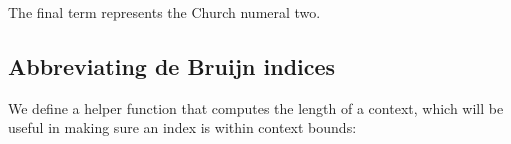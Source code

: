 \begin{fence}
\begin{code}
\AgdaSpace{}%
\AgdaSpace{}%
\AgdaSpace{}%
\AgdaSymbol{))}\<%
\\
%
\\[\AgdaEmptyExtraSkip]%
\>[0]\AgdaFunction{\AgdaUnderscore{}}\AgdaSpace{}%
\AgdaSymbol{:}\AgdaSpace{}%
\AgdaSpace{}%
\AgdaSpace{}%
\AgdaSymbol{(}\AgdaSpace{}%
\AgdaSpace{}%
\AgdaSymbol{)}\AgdaSpace{}%
\AgdaSpace{}%
\AgdaSpace{}%
\AgdaSpace{}%
\<%
\\
\>[0]\AgdaSymbol{\AgdaUnderscore{}}\AgdaSpace{}%
\AgdaSymbol{=}\AgdaSpace{}%
\AgdaSpace{}%
\AgdaSpace{}%
\AgdaSymbol{(}\AgdaSpace{}%
\AgdaSpace{}%
\AgdaSpace{}%
\AgdaSpace{}%
\AgdaSymbol{(}\AgdaSpace{}%
\AgdaSpace{}%
\AgdaSpace{}%
\AgdaSpace{}%
\AgdaSpace{}%
\AgdaSymbol{))}\<%
\end{code}
\end{fence}

The final term represents the Church numeral two.

\hypertarget{abbreviating-de-bruijn-indices}{%
\subsection{Abbreviating de Bruijn
indices}\label{abbreviating-de-bruijn-indices}}

We define a helper function that computes the length of a context, which
will be useful in making sure an index is within context bounds:

\begin{fence}
\begin{code}%
\>[0]\AgdaSpace{}%
\AgdaSymbol{:}\AgdaSpace{}%
\AgdaSpace{}%
\AgdaSpace{}%
\<%
\\
\>[0]\AgdaSpace{}%
%
\>[16]\AgdaSymbol{=}%
\>[19]\<%
\\
\>[0]\AgdaSpace{}%
\AgdaSymbol{(}\AgdaSpace{}%
\AgdaOperator{\AgdaInductiveConstructor{,}}\AgdaSpace{}%
\AgdaSymbol{\AgdaUnderscore{})}%
\>[16]\AgdaSymbol{=}%
\>[19]\AgdaSpace{}%
\AgdaSymbol{(}\AgdaSpace{}%
\AgdaSymbol{)}\<%
\end{code}
\end{fence}

